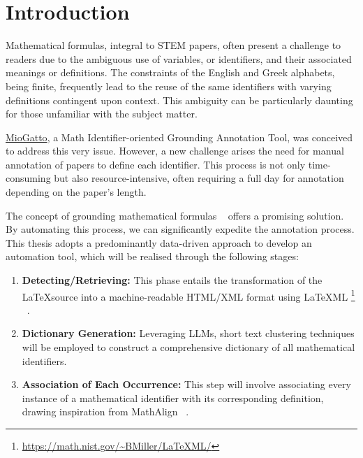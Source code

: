 \chapter{Introduction}\label{chapter:introduction}

Mathematical formulas, integral to STEM papers, often present a challenge to readers due to the ambiguous use of variables, or identifiers, and their associated meanings or definitions. The constraints of the English and Greek alphabets, being finite, frequently lead to the reuse of the same identifiers with varying definitions contingent upon context. This ambiguity can be particularly daunting for those unfamiliar with the subject matter.

\href{https://github.com/wtsnjp/MioGatto/tree/main}{MioGatto}, a Math Identifier-oriented Grounding Annotation Tool, was conceived to address this very issue. However, a new challenge arises the need for manual annotation of papers to define each identifier. This process is not only time-consuming but also resource-intensive, often requiring a full day for annotation depending on the paper's length.

The concept of grounding mathematical formulas ~\parencite{asakura-etal-2020-towards} offers a promising solution. By automating this process, we can significantly expedite the annotation process. This thesis adopts a predominantly data-driven approach to develop an automation tool, which will be realised through the following stages:

\begin{enumerate}
    \item \textbf{Detecting/Retrieving:} This phase entails the transformation of the \LaTeX \space source into a machine-readable HTML/XML format using \LaTeX ML \footnote{\url{https://math.nist.gov/~BMiller/LaTeXML/}} ~\parencite{ginev2011latexml}.
    
    \item \textbf{Dictionary Generation:} Leveraging \ac{LLMs}, short text clustering techniques will be employed to construct a comprehensive dictionary of all mathematical identifiers.
    
    \item \textbf{Association of Each Occurrence:} This step will involve associating every instance of a mathematical identifier with its corresponding definition, drawing inspiration from MathAlign ~\parencite{alexeeva2020mathalign}.
\end{enumerate}


